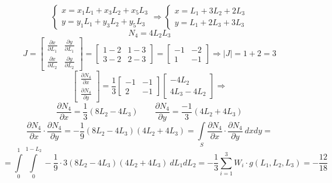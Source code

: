 	\[
	\begin{cases}
		x=x_1L_1+x_3L_2+x_5L_3 \\
		y = y_1L_1+y_3L_2+y_5L_3 
	\end{cases}
	\Rightarrow \begin{cases}
		x=L_1+3L_2+2L_3 \\
		y=L_1+2L_3+3L_3
	\end{cases}
	\]
	\[
	N_4=4L_2L_3
	\]
	\[
	J=\begin{bmatrix}
		\frac{\partial x}{\partial L_1} & \frac{\partial y}{\partial L_1} \\
		\frac{\partial x}{\partial L_2} & \frac{\partial y}{\partial L_2}
	\end{bmatrix} = \begin{bmatrix}
	1-2 & 1-3 \\ 3-2 & 2-3 
	\end{bmatrix} = \begin{bmatrix}
	-1 & -2 \\ 1 & -1
	\end{bmatrix} \Rightarrow |J|=1+2=3
	\]
	\[
	\begin{bmatrix}
		\frac{\partial N_4}{\partial x} \\ \frac{\partial N_4}{\partial y}
	\end{bmatrix} = \frac{1}{3} \begin{bmatrix}
	-1 & -1 \\ 2 & -1 
	\end{bmatrix}\begin{bmatrix}
	-4L_2 \\ 4L_3-4L_2
	\end{bmatrix} \Rightarrow 
	\] 
	\[
	\frac{\partial N_4}{\partial x}=\frac{1}{3}(8L_2-4L_3) \qquad 
	\frac{\partial N_4}{\partial  y}=\frac{-1}{3}(4L_2+4L_3)
	\]
	\[
	\frac{\partial N_4}{\partial x}\cdot\frac{\partial N_4}{\partial y}=-\frac{1}{9}(8L_2-4L_3)(4L_2+4L_3)=\int\limits_S \frac{\partial N_4}{\partial x}\cdot\frac{\partial N_4}{\partial y}\ dxdy = 
	\]
	\[
	=\int\limits_0^1\int\limits_0^{1-L_2} -\frac{1}{9}\cdot 3 (8L_2-4L_3)(4L_2+4L_3) \ dL_1dL_2 = -\frac{1}{3} \sum\limits_{i=1}^{3} W_i\cdot g(L_1, L_2, L_3) = -\frac{12}{18}
	\]